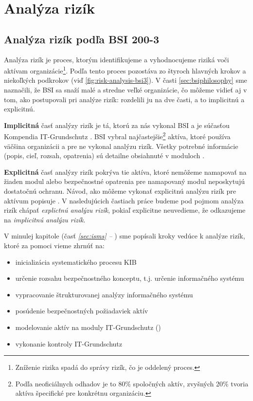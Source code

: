 \chapter{Analýza rizík}
\label{chap:risk-analysis}
\section{Analýza rizík podľa BSI 200-3}
Analýza rizík je proces, ktorým identifikujeme a vyhodnocujeme riziká voči aktívam organizácie\footnote{Zníženie rizika spadá do správy
rizík, čo je oddelený proces.}. Podľa \cite{BSI3} tento proces pozostáva zo štyroch hlavných krokov a niekoľkých podkrokov (viď
\ref{fig:risk-analysis-bsi3}). V časti \ref{sec:bsiphilosophy} sme naznačili, že BSI sa snaží  malé a stredne veľké
organizácie, čo môžeme vidieť aj v tom, ako postupovali pri analýze rizík: rozdelili ju na dve časti, a to implicitnú a explicitnú.



\textbf{Implicitná} časť analýzy rizík je tá, ktorú za nás vykonal BSI a je súčasťou Kompendia IT-Grundschutz \cite{GSK}. BSI vybral
najčastejšie\footnote{Podľa neoficiálnych odhadov je to 80\% spoločných aktív, zvyšných 20\% tvoria aktíva špecifické pre konkrétnu organizáciu.}
aktíva, ktoré používa väčšina organizácii a pre ne vykonal analýzu rizík. Všetky potrebné informácie (popis, cieľ, rozsah, opatrenia) sú
detailne obsiahnuté v moduloch \cite{GSK}.

\textbf{Explicitná} časť analýzy rizík pokrýva tie aktíva, ktoré nemôžeme namapovať na žiaden modul \cite{GSK} alebo bezpečnostné opatrenia pre
namapovaný modul \cite{GSK} neposkytujú dostatočnú ochranu. Návod, ako môžeme vykonať explicitnú analýzu rizík pre aktívum popisuje \cite{BSI3}.
V nasledujúcich častiach práce budeme pod pojmom analýza rizík chápať \emph{explictnú analýzu rizík}, pokiaľ explicitne neuvedieme, že 
odkazujeme na \emph{implicitnú analýzu rizík}.

V minulej kapitole (časť \emph{\ref{sec:isms} -- }) sme popísali kroky vedúce k analýze rizík, ktoré za pomoci \cite{BSI2} vieme zhrnúť na:
\begin{itemize}[nosep]
    \item inicializácia systematického procesu KIB
    \item určenie rozsahu bezpečnostného konceptu, t.j. určenie informačného systému
    \item vypracovanie štrukturovanej analýzy informačného systému
    \item posúdenie bezpečnostných požiadaviek aktív
        \item modelovanie aktív na moduly IT-Grundschutz (\cite{GSK})
    \item vykonanie kontroly IT-Grundschutz
\end{itemize}

